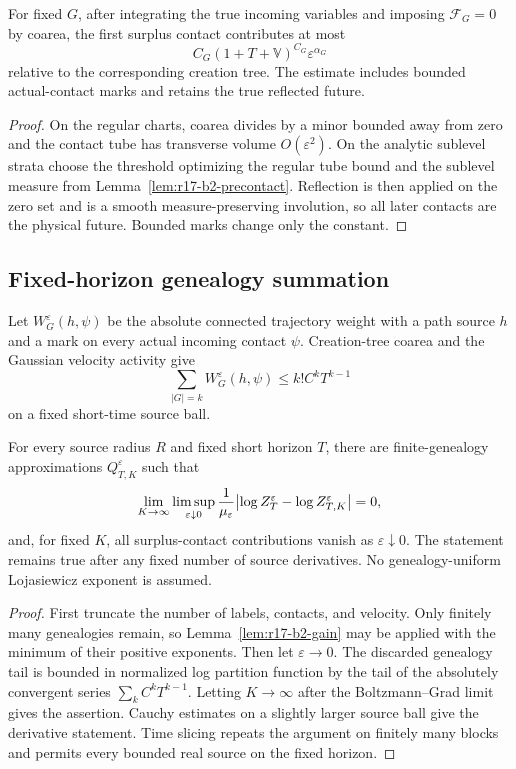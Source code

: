 \begin{lemma}
\label{lem:r17-b2-gain}
For fixed \(G\), after integrating the true incoming variables and imposing
\(\mathcal F_G=0\) by coarea, the first surplus contact contributes at most
\[
 C_G(1+T+\mathbb V)^{C_G}\varepsilon^{\alpha_G}
\]
relative to the corresponding creation tree.  The estimate includes bounded
actual-contact marks and retains the true reflected future.
\end{lemma}

\begin{proof}
On the regular charts, coarea divides by a minor bounded away from zero and
the contact tube has transverse volume \(O(\varepsilon^2)\).  On the analytic
sublevel strata choose the threshold optimizing the regular tube bound and
the sublevel measure from Lemma~\ref{lem:r17-b2-precontact}.  Reflection is
then applied on the zero set and is a smooth measure-preserving involution, so
all later contacts are the physical future.  Bounded marks change only the
constant.
\end{proof}

\subsection{Fixed-horizon genealogy summation}

Let \(W_G^\varepsilon(h,\psi)\) be the absolute connected trajectory weight
with a path source \(h\) and a mark on every actual incoming contact
\(\psi\).  Creation-tree coarea and the Gaussian velocity activity give
\[
 \sum_{|G|=k}W_G^\varepsilon(h,\psi)
 \le k!C^kT^{k-1}
\]
on a fixed short-time source ball.

\begin{theorem}
\label{thm:r17-b2-majorant}
For every source radius \(R\) and fixed short horizon \(T\), there are
finite-genealogy approximations \(Q_{T,K}^{\varepsilon}\) such that
\[
 \lim_{K\to\infty}\limsup_{\varepsilon\downarrow0}
 {1\over\mu_\varepsilon}
 \bigl|\log Z_T^\varepsilon-
       \log Z_{T,K}^\varepsilon\bigr|=0,
\]
and, for fixed \(K\), all surplus-contact contributions vanish as
\(\varepsilon\downarrow0\).  The statement remains true after any fixed
number of source derivatives.  No genealogy-uniform Lojasiewicz exponent is
assumed.
\end{theorem}

\begin{proof}
First truncate the number of labels, contacts, and velocity.  Only finitely
many genealogies remain, so Lemma~\ref{lem:r17-b2-gain} may be applied with
the minimum of their positive exponents.  Then let \(\varepsilon\to0\).
The discarded genealogy tail is bounded in normalized log partition function
by the tail of the absolutely convergent series
\(\sum_k C^kT^{k-1}\).  Letting \(K\to\infty\) after the Boltzmann--Grad limit
gives the assertion.  Cauchy estimates on a slightly larger source ball give
the derivative statement.  Time slicing repeats the argument on finitely many
blocks and permits every bounded real source on the fixed horizon.
\end{proof}

